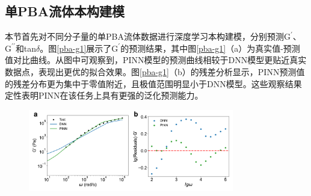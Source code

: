 \subsection{单PBA流体本构建模}
本节首先对不同分子量的单PBA流体数据进行深度学习本构建模，分别预测$\mathrm{G^{\prime}}$、$\mathrm{G^{\prime\prime}}$和tan$\delta$。图\ref{pba-g1}展示了$\mathrm{G^{\prime}}$的预测结果，其中图\ref{pba-g1}（a）为真实值-预测值对比曲线。从图中可观察到，PINN模型的预测曲线相较于DNN模型更贴近真实数据点，表现出更优的拟合效果。图\ref{pba-g1}（b）的残差分析显示，PINN预测值的残差分布更为集中于零值附近，且极值范围明显小于DNN模型。这些观察结果定性表明PINN在该任务上具有更强的泛化预测能力。
\begin{figure}[htbp]
  \centering
  \includegraphics[width=0.8\textwidth]{Fig/pba-g1.pdf}
\end{figure}

